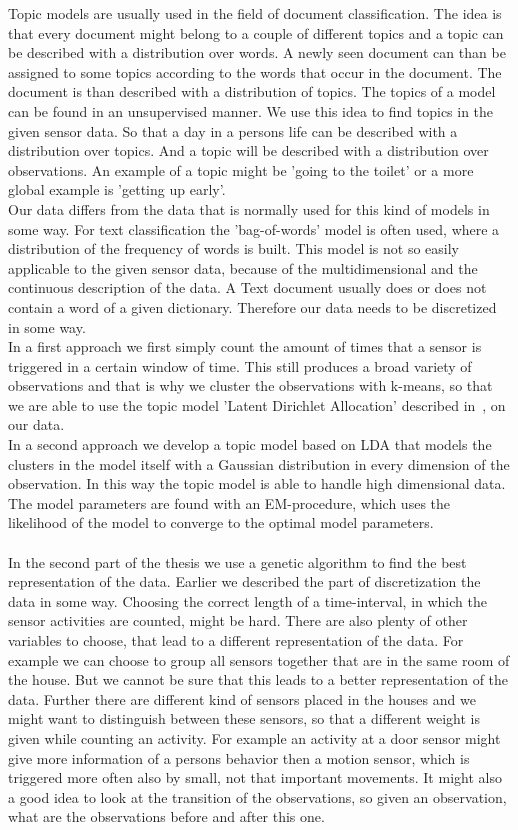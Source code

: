 \documentclass[a4paper,fleqn]{article}
\begin{document}
Topic models are usually used in the field of document classification. The idea is that every document might belong to a couple of different topics and a topic can be described with a distribution over words. A newly seen document can than be assigned to some topics according to the words that occur in the document. The document is than described with a distribution of topics. The topics of a model can be found in an unsupervised manner.
We use this idea to find topics in the given sensor data. So that a day in a persons life can be described with a distribution over topics. And a topic will be described with a distribution over observations. An example of a topic might be 'going to the toilet' or a more global example is 'getting up early'.\\
Our data differs from the data that is normally used for this kind of models in some way. For text classification the 'bag-of-words' model is often used, where a distribution of the frequency of words is built. This model is not so easily applicable to the given sensor data, because of the multidimensional and the continuous description of the data. A Text document usually does or does not contain a word of a given dictionary. Therefore our data needs to be discretized in some way.\\
In a first approach we first simply count the amount of times that a sensor is triggered in a certain window of time. This still produces a broad variety of observations and that is why we cluster the observations with k-means, so that we are able to use the topic model 'Latent Dirichlet Allocation' described in~\cite{blei2003latent}, on our data.\\
In a second approach we develop a topic model based on LDA that models the clusters in the model itself with a Gaussian distribution in every dimension of the observation. In this way the topic model is able to handle high dimensional data. The model parameters are found with an EM-procedure, which uses the likelihood of the model to converge to the optimal model parameters.\\
\\
In the second part of the thesis we use a genetic algorithm to find the best representation of the data.
Earlier we described the part of discretization the data in some way. Choosing the correct length of a time-interval, in which the sensor activities are counted, might be hard. There are also plenty of other variables to choose, that lead to a different representation of the data. For example we can choose to group all sensors together that are in the same room of the house. But we cannot be sure that this leads to a better representation of the data. Further there are different kind of sensors placed in the houses and we might want to distinguish between these sensors, so that a different weight is given while counting an activity. For example an activity at a door sensor might give more information of a persons behavior then a motion sensor, which is triggered more often also by small, not that important movements. It might also a good idea to look at the transition of the observations, so given an observation, what are the observations before and after this one.\\
\end{document}
